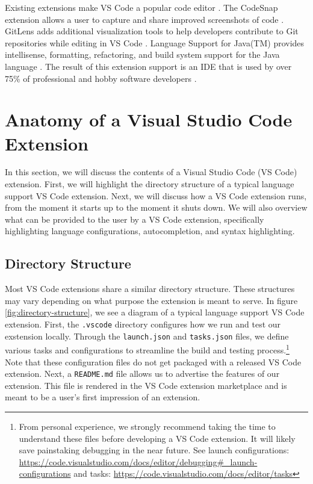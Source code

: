 \documentclass{article}
\begin{document}
Existing extensions make VS Code a popular code editor \cite{StackOverflow_2022}. The CodeSnap extension allows a user to capture and share improved screenshots of code \cite{adpyke_2021}. GitLens adds additional visualization tools to help developers contribute to Git repositories while editing in VS Code \cite{GitKraken_2023}. Language Support for Java(TM) provides intellisense, formatting, refactoring, and build system support for the Java language \cite{RedHat_2023}. The result of this extension support is an IDE that is used by over 75\% of professional and hobby software developers \cite{StackOverflow_2022}. 

\section{Anatomy of a Visual Studio Code Extension}

In this section, we will discuss the contents of a Visual Studio Code (VS Code) extension. First, we will highlight the directory structure of a typical language support VS Code extension. Next, we will discuss how a VS Code extension runs, from the moment it starts up to the moment it shuts down. We will also overview what can be provided to the user by a VS Code extension, specifically highlighting language configurations, autocompletion, and syntax highlighting. 

\subsection{Directory Structure}

Most VS Code extensions share a similar directory structure. These structures may vary depending on what purpose the extension is meant to serve. In figure \ref{fig:directory-structure}, we see a diagram of a typical language support VS Code extension. First, the \lstinline{.vscode} directory configures how we run and test our exstension locally. Through the \lstinline{launch.json} and \lstinline{tasks.json} files, we define various tasks and configurations to streamline the build and testing process.\footnote{From personal experience, we strongly recommend taking the time to understand these files before developing a VS Code extension. It will likely save painstaking debugging in the near future. See launch configurations: \url{https://code.visualstudio.com/docs/editor/debugging\#_launch-configurations} and tasks: \url{https://code.visualstudio.com/docs/editor/tasks}} Note that these configuration files do not get packaged with a released VS Code extension. Next, a \lstinline{README.md} file allows us to advertise the features of our extension. This file is rendered in the VS Code extension marketplace and is meant to be a user's first impression of an extension.
\end{document}
